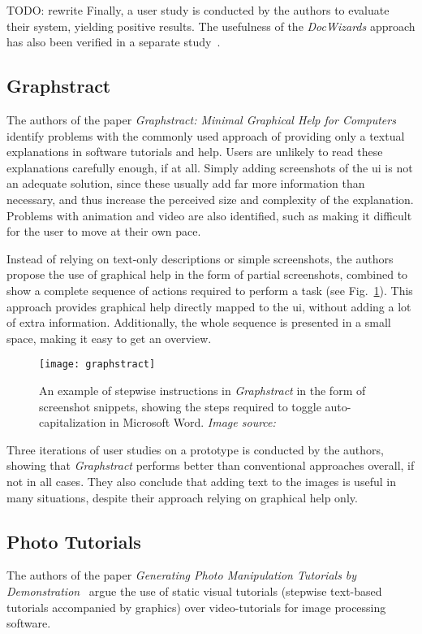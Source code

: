 \noindent
TODO: rewrite
Finally, a user study is conducted by the authors to evaluate their system, yielding positive results. The usefulness of the \emph{DocWizards} approach has also been verified in a separate study~\cite{gweon:evaluating_docwizards}.

\subsection{Graphstract}
\label{sec:graphstract}
The authors of the paper \emph{Graphstract: Minimal Graphical Help for Computers}~\cite{huang:graphstract} identify problems with the commonly used approach of providing only a textual explanations in software tutorials and help. Users are unlikely to read these explanations carefully enough, if at all. Simply adding screenshots of the \gls{ui} is not an adequate solution, since these usually add far more information than necessary, and thus increase the perceived size and complexity of the explanation. Problems with animation and video are also identified, such as making it difficult for the user to move at their own pace.

\noindent
Instead of relying on text-only descriptions or simple screenshots, the authors propose the use of graphical help in the form of partial screenshots, combined to show a complete sequence of actions required to perform a task (see Fig.~\ref{fig:graphstract}). This approach provides graphical help directly mapped to the \gls{ui}, without adding a lot of extra information. Additionally, the whole sequence is presented in a small space, making it easy to get an overview.

\begin{figure}[htp]
	\centering
	\texttt{[image: graphstract]}
	\caption[\emph{Graphstract} example]{An example of stepwise instructions in \emph{Graphstract} in the form of screenshot snippets, showing the steps required to toggle auto-capitalization in Microsoft Word. \emph{Image source:~\cite{huang:graphstract}}}
	\label{fig:graphstract}
\end{figure}

\noindent
Three iterations of user studies on a prototype is conducted by the authors, showing that \emph{Graphstract} performs better than conventional approaches overall, if not in all cases. They also conclude that adding text to the images is useful in many situations, despite their approach relying on graphical help only.

\subsection{Photo Tutorials}
\label{sec:photo_tutorials}
The authors of the paper \emph{Generating Photo Manipulation Tutorials by Demonstration}~\cite{grabler:photo_tutorials} argue the use of static visual tutorials (stepwise text-based tutorials accompanied by graphics) over video-tutorials for image processing software.

